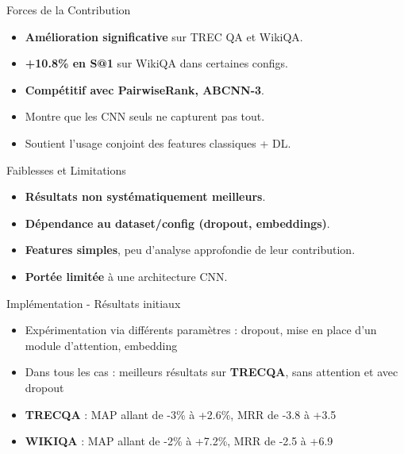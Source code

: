 \documentclass{beamer}
\begin{document}
\begin{frame}{Forces de la Contribution}
  \begin{itemize}
    \item \textbf{Amélioration significative} sur TREC QA et WikiQA.
    \item \textbf{+10.8\% en S@1} sur WikiQA dans certaines configs.
    \item \textbf{Compétitif avec PairwiseRank, ABCNN-3}.
    \item Montre que les CNN seuls ne capturent pas tout.
    \item Soutient l’usage conjoint des features classiques + DL.
  \end{itemize}
\end{frame}

\begin{frame}{Faiblesses et Limitations}
  \begin{itemize}
    \item \textbf{Résultats non systématiquement meilleurs}.
    \item \textbf{Dépendance au dataset/config (dropout, embeddings)}.
    \item \textbf{Features simples}, peu d’analyse approfondie de leur contribution.
    \item \textbf{Portée limitée} à une architecture CNN.
  \end{itemize}
\end{frame}

\begin{frame}{Implémentation - Résultats initiaux}
  \begin{itemize}
    \item Expérimentation via différents paramètres : dropout, mise en place d'un module d'attention, embedding
    \item Dans tous les cas : meilleurs résultats sur \textbf{TRECQA}, sans attention et avec dropout
    \item \textbf{TRECQA} : MAP allant de -3\% à +2.6\%, MRR de -3.8 à +3.5
    \item \textbf{WIKIQA} : MAP allant de -2\% à +7.2\%, MRR de -2.5 à +6.9
  \end{itemize}
\end{frame}
\end{document}
